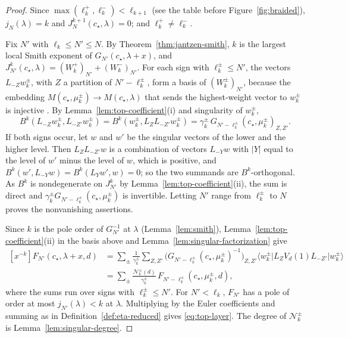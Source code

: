 \documentclass[twoside,10pt]{article}
\numberwithin{equation}{section}
\theoremstyle{slbody}
\theoremstyle{definition}
\theoremstyle{remark}
\begin{document}
\begin{proof}
Since \(\max(\ell^+_k,\ell^-_k)<\ell_{k+1}\) (see the table before
Figure~\ref{fig:braided}), \(j_N(\lambda)=k\) and
\(J^{k+1}_N(c_\star,\lambda)=0\); and \(\ell^+_k\neq\ell^-_k\).

Fix \(N'\) with \(\ell_k\leq N'\leq N\).  By
Theorem~\ref{thm:jantzen-smith}, \(k\) is the largest local Smith exponent
of \(G_{N'}(c_\star,\lambda+x)\), and
\(J^k_{N'}(c_\star,\lambda)=(W^+_k)_{N'}+(W^-_k)_{N'}\).  For each sign with
\(\ell^\pm_k\leq N'\), the vectors \(L_{-Z}w^\pm_k\), with \(Z\) a partition
of \(N'-\ell^\pm_k\), form a basis of \((W^\pm_k)_{N'}\), because the
embedding \(M(c_\star,\mu^\pm_k)\to M(c_\star,\lambda)\) that sends the
highest-weight vector to \(w^\pm_k\) is injective
\cite[the paragraph preceding Corollary~5.2]{IoharaKoga2011}.  By
Lemma~\ref{lem:top-coefficient}(i) and singularity of \(w^\pm_k\),
\[
 B^k(L_{-Z}w^\pm_k,L_{-Z'}w^\pm_k)=B^k(w^\pm_k,L_ZL_{-Z'}w^\pm_k)
 =\gamma^\pm_k\,G_{N'-\ell^\pm_k}(c_\star,\mu^\pm_k)_{Z,Z'} .
\]
If both signs occur, let \(w\) and \(w'\) be the singular vectors of the
lower and the higher level.  Then \(L_ZL_{-Z'}w\) is a combination of
vectors \(L_{-Y}w\) with \(|Y|\) equal to the level of \(w'\) minus the level
of \(w\), which is positive, and
\(B^k(w',L_{-Y}w)=B^k(L_Yw',w)=0\); so the two summands are
\(B^k\)-orthogonal.  As \(B^k\) is nondegenerate on \(J^k_{N'}\) by
Lemma~\ref{lem:top-coefficient}(ii), the sum is direct and
\(\gamma^\pm_kG_{N'-\ell^\pm_k}(c_\star,\mu^\pm_k)\) is invertible.  Letting
\(N'\) range from \(\ell^\pm_k\) to \(N\) proves the nonvanishing
assertions.

Since \(k\) is the pole order of \(G_{N'}^{-1}\) at \(\lambda\)
(Lemma~\ref{lem:smith}), Lemma~\ref{lem:top-coefficient}(ii) in the basis
above and Lemma~\ref{lem:singular-factorization} give
\[
 \begin{aligned}
 [x^{-k}]F_{N'}(c_\star,\lambda+x,d)
 &=\sum_{\pm}\frac1{\gamma^\pm_k}\sum_{Z,Z'}
 \bigl(G_{N'-\ell^\pm_k}(c_\star,\mu^\pm_k)^{-1}\bigr)_{Z,Z'}
 \langle w^\pm_k|L_ZV_d(1)L_{-Z'}|w^\pm_k\rangle\\
 &=\sum_{\pm}\frac{\mathcal N^\pm_k(d)}{\gamma^\pm_k}\,
 F_{N'-\ell^\pm_k}(c_\star,\mu^\pm_k,d),
 \end{aligned}
\]
where the sums run over signs with \(\ell^\pm_k\leq N'\).  For
\(N'<\ell_k\), \(F_{N'}\) has a pole of order at most
\(j_{N'}(\lambda)<k\) at \(\lambda\).  Multiplying by the Euler
coefficients and summing as in Definition~\ref{def:eta-reduced} gives
\eqref{eq:top-layer}.  The degree of \(\mathcal N^\pm_k\) is
Lemma~\ref{lem:singular-degree}.
\end{proof}
\end{document}
